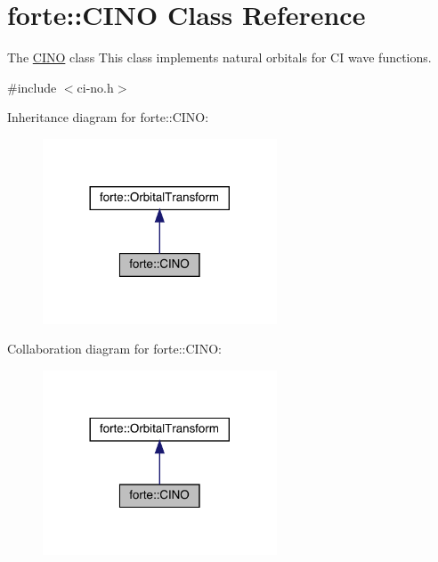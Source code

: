 \hypertarget{classforte_1_1_c_i_n_o}{}\section{forte\+:\+:C\+I\+NO Class Reference}
\label{classforte_1_1_c_i_n_o}


The \mbox{\hyperlink{classforte_1_1_c_i_n_o}{C\+I\+NO}} class This class implements natural orbitals for CI wave functions.  




{\ttfamily \#include $<$ci-\/no.\+h$>$}



Inheritance diagram for forte\+:\+:C\+I\+NO\+:
\nopagebreak
\begin{figure}[H]
\begin{center}
\leavevmode
\includegraphics[width=197pt]{classforte_1_1_c_i_n_o__inherit__graph}
\end{center}
\end{figure}


Collaboration diagram for forte\+:\+:C\+I\+NO\+:
\nopagebreak
\begin{figure}[H]
\begin{center}
\leavevmode
\includegraphics[width=197pt]{classforte_1_1_c_i_n_o__coll__graph}
\end{center}
\end{figure}
